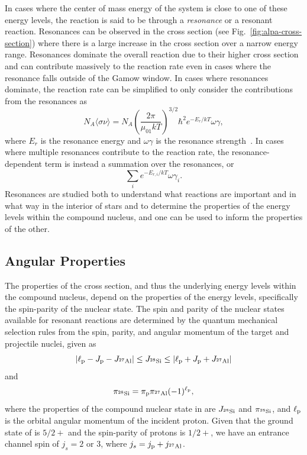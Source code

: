 In cases where the center of mass energy of the system is close to one
of these energy levels, the reaction is said to be through a
\emph{resonance} or a resonant reaction. Resonances can be observed in
the cross section (see Fig.~\ref{fig:alpa-cross-section}) where there is
a large increase in the cross section over a narrow energy range.
Resonances dominate the overall reaction due to their higher cross
section and can contribute massively to the reaction rate even in cases
where the resonance falls outside of the Gamow window. In cases where
resonances dominate, the reaction rate can be simplified to only
consider the contributions from the resonances as
\[
    N_A\langle\sigma\nu\rangle = N_A\left(\frac{2\pi}{\mu_{01}kT}\right)^{3/2}
        \hbar^2e^{-E_r/kT}\omega\gamma,
\]
where $E_r$ is the resonance energy and $\omega\gamma$ is the resonance
strength~\cite{Iliadis}. In cases where multiple resonances contribute
to the reaction rate, the resonance-dependent term is instead a
summation over the resonances, or
\[
    \sum_i e^{-E_{r,i}/kT}\omega\gamma_i.
\]
Resonances are studied both to understand what reactions are important
and in what way in the interior of stars and to determine the properties
of the energy levels within the compound nucleus, and one can be used to
inform the properties of the other.

\subsection{Angular Properties}

The properties of the cross section, and thus the underlying energy
levels within the compound nucleus, depend on the properties of the
energy levels, specifically the spin-parity of the nuclear state. The
spin and parity of the nuclear states available for resonant reactions
are determined by the quantum mechanical selection rules from the spin,
parity, and angular momentum of the target and projectile nuclei, given
as
\[
    \left|\ell_{\rm{p}} - J_{\rm{p}} - J_{{}^{27}\textrm{Al}}\right|
    \leq J_{{}^{28}\textrm{Si}} \leq
    \left|\ell_{\rm{p}} + J_{\rm{p}} + J_{{}^{27}\textrm{Al}}\right|
\]
and
\[
    \pi_{{}^{28}\textrm{Si}} = \pi_{\rm{p}}\pi_{{}^{27}\textrm{Al}}(-1)^{\ell_{\rm{p}}},
\]
where the properties of the compound nuclear state in  are
$J_{{}^{28}\textrm{Si}}$ and $\pi_{{}^{28}\textrm{Si}}$, and $\ell_{\rm{p}}$ is
the orbital angular momentum of the incident proton. Given that the
ground state of  is $5/2+$ and the spin-parity of protons is
$1/2+$, we have an entrance channel spin of $j_s = 2$ or 3, where
$j_s = j_{\rm{p}} + j_{{}^{27}\textrm{Al}}$.

